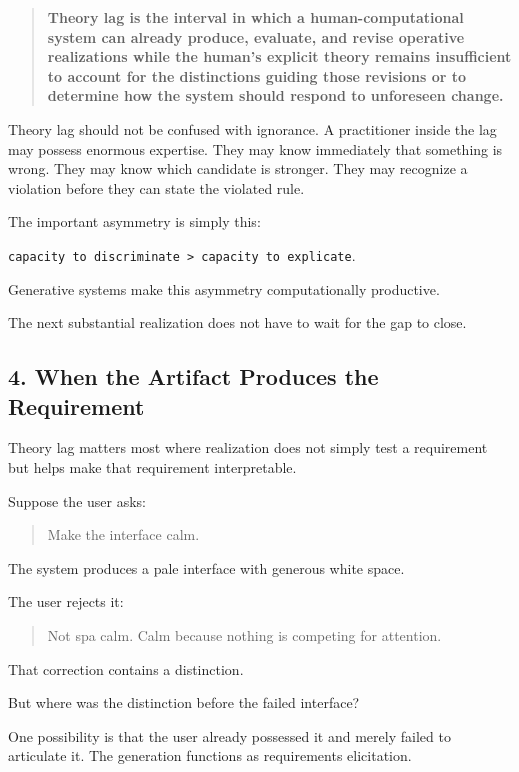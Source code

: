 \documentclass[
]{article}
\begin{document}
\begin{quote}
\textbf{Theory lag is the interval in which a human-computational system
can already produce, evaluate, and revise operative realizations while
the human's explicit theory remains insufficient to account for the
distinctions guiding those revisions or to determine how the system
should respond to unforeseen change.}
\end{quote}

Theory lag should not be confused with ignorance. A practitioner inside
the lag may possess enormous expertise. They may know immediately that
something is wrong. They may know which candidate is stronger. They may
recognize a violation before they can state the violated rule.

The important asymmetry is simply this:

\texttt{capacity\ to\ discriminate\ \textgreater{}\ capacity\ to\ explicate}.

Generative systems make this asymmetry computationally productive.

The next substantial realization does not have to wait for the gap to
close.

\subsection{4. When the Artifact Produces the
Requirement}\label{when-the-artifact-produces-the-requirement}

Theory lag matters most where realization does not simply test a
requirement but helps make that requirement interpretable.

Suppose the user asks:

\begin{quote}
Make the interface calm.
\end{quote}

The system produces a pale interface with generous white space.

The user rejects it:

\begin{quote}
Not spa calm. Calm because nothing is competing for attention.
\end{quote}

That correction contains a distinction.

But where was the distinction before the failed interface?

One possibility is that the user already possessed it and merely failed
to articulate it. The generation functions as requirements elicitation.
\end{document}
